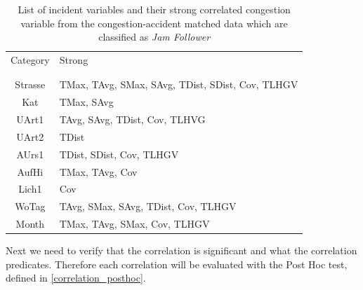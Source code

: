 \begin{table}[h!]
	\centering
	\begin{tabular}{c|l}  
		Category & Strong \\
		\\[-1em]
		\hline
		\\[-1em]
		Strasse & TMax, TAvg, SMax, SAvg, TDist, SDist, Cov, TLHGV \\ 
 		Kat & TMax, SAvg \\ %
 		UArt1 & TAvg, SAvg, TDist, Cov, TLHVG \\ %
 		UArt2 & TDist \\ %
 		AUrs1 & TDist, SDist, Cov, TLHGV \\ %
 		AufHi & TMax, TAvg, Cov \\ %
 		Lich1 & Cov \\ %
 		WoTag & TAvg, SMax, SAvg, TDist, Cov, TLHGV \\ %
 		Month & TMax, TAvg, SMax, Cov, TLHGV \\ %
	\end{tabular}
    \caption{List of incident variables and their strong correlated congestion variable from the congestion-accident matched data which are classified as \textit{Jam Follower}}
	\label{tbl:correlation_list_baysis_follower}
\end{table}
Next we need to verify that the correlation is significant and what the correlation predicates. Therefore each correlation will be evaluated with the Post Hoc test, defined in \cref{correlation_posthoc}. 
